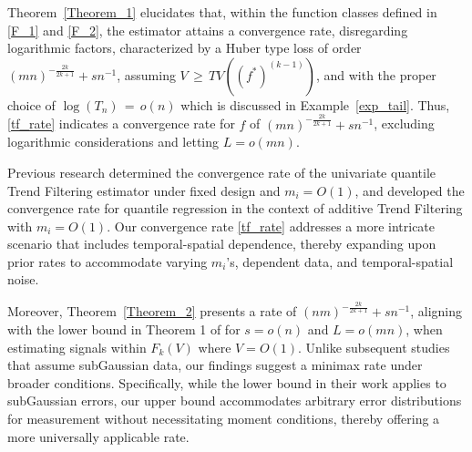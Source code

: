 \documentclass[twoside,11pt]{article}
\begin{document}
Theorem~\ref{Theorem_1} elucidates that, within the function classes defined in \eqref{F_1} and \eqref{F_2}, the estimator attains a convergence rate, disregarding logarithmic factors, characterized by a Huber type loss of order \((mn)^{-\frac{2k}{2k+1}} + sn^{-1}\), assuming \(V \,\geq\, TV((f^*)^{(k-1)})\),  and with the proper choice of $\log(T_n) \,=\, o(n)$ which is discussed in Example~\ref{exp_tail}. Thus, \eqref{tf_rate} indicates a convergence rate for \(\hat{f}\) of \((mn)^{-\frac{2k}{2k+1}} + sn^{-1}\), excluding logarithmic considerations and letting $L = o(mn)$.

Previous research \cite{madrid2022risk} determined the convergence rate of the univariate quantile Trend Filtering estimator under fixed design and \(m_i = O(1)\), and \cite{zhang2023risk} developed the convergence rate for quantile regression in the context of additive Trend Filtering with \(m_i = O(1)\). Our convergence rate \eqref{tf_rate} addresses a more intricate scenario that includes temporal-spatial dependence, thereby expanding upon prior rates to accommodate varying \(m_i\)'s, dependent data, and temporal-spatial noise.

Moreover, Theorem~\ref{Theorem_2} presents a rate of \((nm)^{-\frac{2k}{2k+1}} + sn^{-1}\), aligning with the lower bound in Theorem 1 of \cite{padilla2023temporal} for \(s = o(n)\) and \(L = o(mn)\), when estimating signals within \(F_k(V)\) where \(V = O(1)\). Unlike subsequent studies that assume subGaussian data, our findings suggest a minimax rate under broader conditions. Specifically, while the lower bound in their work applies to subGaussian errors, our upper bound accommodates arbitrary error distributions for measurement without necessitating moment conditions, thereby offering a more universally applicable rate.






\end{document}
